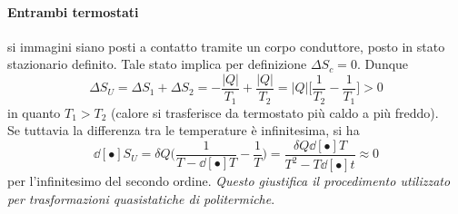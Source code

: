 \documentclass[10pt, oneside]{book}
\newcommand{\deltas}[1]{\Delta S_{#1}}
\newcommand{\ds}{\displaystyle}
\begin{document}
\paragraph{Entrambi termostati} si immagini siano posti a contatto tramite un corpo conduttore, posto in stato stazionario definito. Tale stato implica per definizione $\ds \Delta S_c = 0$. Dunque
\[\Delta S_U = \deltas{1} + \deltas{2} = - \frac{|Q|}{T_1} + \frac{|Q|}{T_2} = |Q| \big[\frac{1}{T_2} - \frac{1}{T_1}\big] > 0\]
in quanto $T_1 > T_2$ (calore si trasferisce da termostato più caldo a più freddo).\\
Se tuttavia la differenza tra le temperature è infinitesima, si ha
\[\dd[•]{S}_U = \delta Q \bigg(\frac{1}{T - \dd[•]{T}} - \frac{1}{T}\bigg) = \frac{\delta Q \dd[•]{T}}{T^2 - T\dd[•]{t}} \approx 0\]
per l'infinitesimo del secondo ordine. \textit{Questo giustifica il procedimento utilizzato per trasformazioni quasistatiche di politermiche}. 
\end{document}
